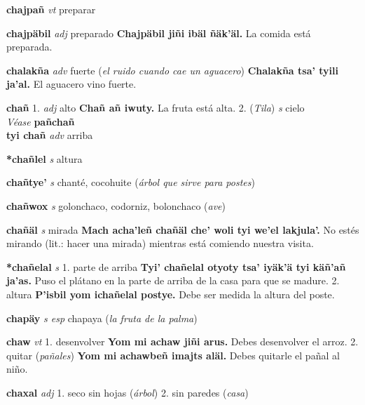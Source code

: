 \documentclass[10pt]{scrbook}
\newcommand{\entry}[1]{\textbf{#1}}
\newcommand{\onedefinition}[1]{#1.}
\newcommand{\partofspeech}[1]{\textit{#1}}
\newcommand{\spanishtranslation}[1]{#1}
\newcommand{\clarification}[1]{(\textit{#1})}
\newcommand{\cholexample}[1]{\textbf{#1}}
\newcommand{\exampletranslation}[1]{#1}
\newcommand{\alsosee}[1]{\\\textit{Véase} \textbf{#1}}
\newcommand{\relevantdialect}[1]{(\textit{#1})}
\newcommand{\secondaryentry}[1]{\\\textbf{#1}}
\newcommand{\secondpartofspeech}[1]{\textit{#1}}
\newcommand{\secondtranslation}[1]{#1}
\begin{document}
\begin{multicols}{2}
\entry{chajpañ}
\partofspeech{vt}
\spanishtranslation{preparar}

\entry{chajpäbil}
\partofspeech{adj}
\spanishtranslation{preparado}
\cholexample{Chajpäbil jiñi ibäl ñäk'äl.}
\exampletranslation{La comida está preparada.}

\entry{chalakña}
\partofspeech{adv}
\spanishtranslation{fuerte}
\clarification{el ruido cuando cae un aguacero}
\cholexample{Chalakña tsa' tyili ja'al.}
\exampletranslation{El aguacero vino fuerte.}

\entry{chañ}
\onedefinition{1}
\partofspeech{adj}
\spanishtranslation{alto}
\cholexample{Chañ añ iwuty.}
\exampletranslation{La fruta está alta.}
\onedefinition{2}
\relevantdialect{Tila}
\partofspeech{s}
\spanishtranslation{cielo}
\alsosee{pañchañ}
\secondaryentry{tyi chañ}
\secondpartofspeech{adv}
\secondtranslation{arriba}

\entry{*chañlel}
\partofspeech{s}
\spanishtranslation{altura}

\entry{chañtye'}
\partofspeech{s}
\spanishtranslation{chanté, cocohuite}
\clarification{árbol que sirve para postes}

\entry{chañwox}
\partofspeech{s}
\spanishtranslation{golonchaco, codorniz, bolonchaco}
\clarification{ave}

\entry{chañäl}
\partofspeech{s}
\spanishtranslation{mirada}
\cholexample{Mach acha'leñ chañäl che' woli tyi we'el lakjula'.}
\exampletranslation{No estés mirando (lit.: hacer una mirada) mientras está comiendo nuestra visita.}

\entry{*chañelal}
\partofspeech{s}
\onedefinition{1}
\spanishtranslation{parte de arriba}
\cholexample{Tyi' chañelal otyoty tsa' iyäk'ä tyi käñ'añ ja'as.}
\exampletranslation{Puso el plátano en la parte de arriba de la casa para que se madure.}
\onedefinition{2}
\spanishtranslation{altura}
\cholexample{P'isbil yom ichañelal postye.}
\exampletranslation{Debe ser medida la altura del poste.}

\entry{chapäy}
\partofspeech{s esp}
\spanishtranslation{chapaya}
\clarification{la fruta de la palma}

\entry{chaw}
\partofspeech{vt}
\onedefinition{1}
\spanishtranslation{desenvolver}
\cholexample{Yom mi achaw jiñi arus.}
\exampletranslation{Debes desenvolver el arroz.}
\onedefinition{2}
\spanishtranslation{quitar}
\clarification{pañales}
\cholexample{Yom mi achawbeñ imajts aläl.}
\exampletranslation{Debes quitarle el pañal al niño.}

\entry{chaxal}
\partofspeech{adj}
\onedefinition{1}
\spanishtranslation{seco sin hojas}
\clarification{árbol}
\onedefinition{2}
\spanishtranslation{sin paredes}
\clarification{casa}


\end{multicols}
\end{document}
